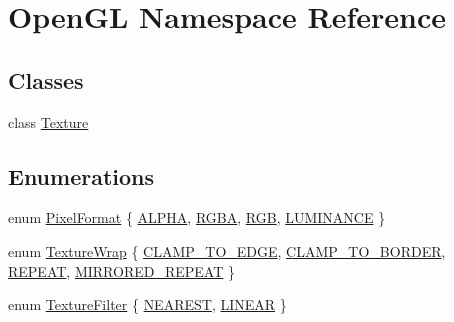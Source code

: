 \hypertarget{namespace_open_g_l}{}\section{Open\+GL Namespace Reference}
\label{namespace_open_g_l}
\subsection*{Classes}
\begin{DoxyCompactItemize}
\item 
class \mbox{\hyperlink{class_open_g_l_1_1_texture}{Texture}}
\end{DoxyCompactItemize}
\subsection*{Enumerations}
\begin{DoxyCompactItemize}
\item 
enum \mbox{\hyperlink{namespace_open_g_l_a85472a7a9e32091b8a7ed8dc728d505b}{Pixel\+Format}} \{ \mbox{\hyperlink{namespace_open_g_l_a85472a7a9e32091b8a7ed8dc728d505babb0a1cdf165ccbcd94114119803aaf2f}{A\+L\+P\+HA}}, 
\mbox{\hyperlink{namespace_open_g_l_a85472a7a9e32091b8a7ed8dc728d505bad76f2c0f70a03f53d013791255c27a57}{R\+G\+BA}}, 
\mbox{\hyperlink{namespace_open_g_l_a85472a7a9e32091b8a7ed8dc728d505baf660b65e5aef959ad59bf883ac1ac68d}{R\+GB}}, 
\mbox{\hyperlink{namespace_open_g_l_a85472a7a9e32091b8a7ed8dc728d505baf05e46a6654da6f06eaa6d2728070ca0}{L\+U\+M\+I\+N\+A\+N\+CE}}
 \}
\item 
enum \mbox{\hyperlink{namespace_open_g_l_a22eb6a3df5ed600fb89f2baf8d1c8027}{Texture\+Wrap}} \{ \mbox{\hyperlink{namespace_open_g_l_a22eb6a3df5ed600fb89f2baf8d1c8027a0b029a6395a3dc192fc4a764f5fd7c44}{C\+L\+A\+M\+P\+\_\+\+T\+O\+\_\+\+E\+D\+GE}}, 
\mbox{\hyperlink{namespace_open_g_l_a22eb6a3df5ed600fb89f2baf8d1c8027ae82f2a46f94386eb463d8a321d1c3e14}{C\+L\+A\+M\+P\+\_\+\+T\+O\+\_\+\+B\+O\+R\+D\+ER}}, 
\mbox{\hyperlink{namespace_open_g_l_a22eb6a3df5ed600fb89f2baf8d1c8027a36427ee76735cc543bacd863a98fc778}{R\+E\+P\+E\+AT}}, 
\mbox{\hyperlink{namespace_open_g_l_a22eb6a3df5ed600fb89f2baf8d1c8027a60aef694e872ad46d23552e44a0266e5}{M\+I\+R\+R\+O\+R\+E\+D\+\_\+\+R\+E\+P\+E\+AT}}
 \}
\item 
enum \mbox{\hyperlink{namespace_open_g_l_a34bc5965567ca64f43e5e38e7cfdb2e4}{Texture\+Filter}} \{ \mbox{\hyperlink{namespace_open_g_l_a34bc5965567ca64f43e5e38e7cfdb2e4a59d58ec609014229fca9093cd9d3c0c5}{N\+E\+A\+R\+E\+ST}}, 
\mbox{\hyperlink{namespace_open_g_l_a34bc5965567ca64f43e5e38e7cfdb2e4a112eab078520a6927d8b9a8e1e85b9aa}{L\+I\+N\+E\+AR}}
 \}
\end{DoxyCompactItemize}


